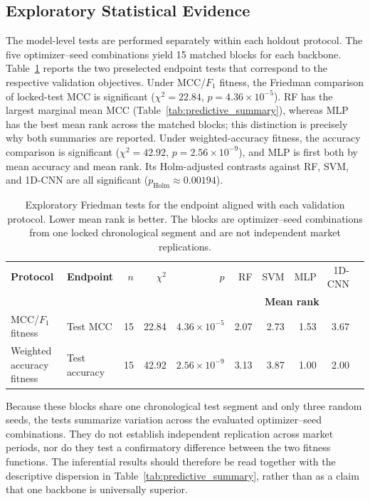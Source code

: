 \subsection{Exploratory Statistical Evidence}

The model-level tests are performed separately within each holdout protocol. The five optimizer--seed combinations yield 15 matched blocks for each backbone. Table~\ref{tab:predictive_inference} reports the two preselected endpoint tests that correspond to the respective validation objectives. Under MCC/$F_1$ fitness, the Friedman comparison of locked-test MCC is significant ($\chi^2=22.84$, $p=4.36\times10^{-5}$). RF has the largest marginal mean MCC (Table~\ref{tab:predictive_summary}), whereas MLP has the best mean rank across the matched blocks; this distinction is precisely why both summaries are reported. Under weighted-accuracy fitness, the accuracy comparison is significant ($\chi^2=42.92$, $p=2.56\times10^{-9}$), and MLP is first both by mean accuracy and mean rank. Its Holm-adjusted contrasts against RF, SVM, and 1D-CNN are all significant ($p_{\mathrm{Holm}}\approx0.00194$).

\begin{table}[htbp]
\centering
\caption{Exploratory Friedman tests for the endpoint aligned with each validation protocol. Lower mean rank is better. The blocks are optimizer--seed combinations from one locked chronological segment and are not independent market replications.}
\label{tab:predictive_inference}
\small
\begin{tabular}{llrrrrrrrr}\toprule
\textbf{Protocol} & \textbf{Endpoint} & $n$ & $\chi^2$ & $p$ & RF & SVM & MLP & 1D-CNN\\
& & & & & \multicolumn{4}{c}{\textbf{Mean rank}}\\\midrule
MCC/$F_1$ fitness & Test MCC & 15 & 22.84 & $4.36\times10^{-5}$ & 2.07 & 2.73 & 1.53 & 3.67\\
Weighted accuracy fitness & Test accuracy & 15 & 42.92 & $2.56\times10^{-9}$ & 3.13 & 3.87 & 1.00 & 2.00\\\bottomrule
\end{tabular}
\end{table}

Because these blocks share one chronological test segment and only three random seeds, the tests summarize variation across the evaluated optimizer--seed combinations. They do not establish independent replication across market periods, nor do they test a confirmatory difference between the two fitness functions. The inferential results should therefore be read together with the descriptive dispersion in Table~\ref{tab:predictive_summary}, rather than as a claim that one backbone is universally superior.

